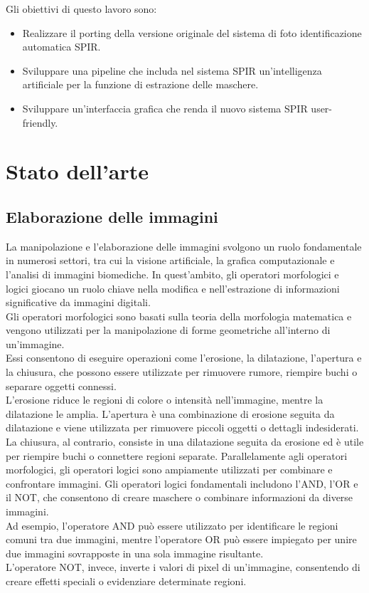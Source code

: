 \documentclass[a4paper,12pt]{report}
\begin{document}
  Gli obiettivi di questo lavoro sono: 
  \begin{itemize}
    \item Realizzare il porting della versione originale del sistema di foto identificazione automatica SPIR.
    \item Sviluppare una pipeline che includa nel sistema SPIR un'intelligenza artificiale per la funzione di estrazione delle maschere.
    \item Sviluppare un'interfaccia grafica che renda il nuovo sistema SPIR user-friendly.

  \end{itemize}



  \section{Stato dell'arte}
    \subsection{Elaborazione delle immagini}
      La manipolazione e l'elaborazione delle immagini svolgono un ruolo fondamentale in numerosi settori, tra cui la visione artificiale, la grafica computazionale e l'analisi di immagini biomediche. 
      In quest'ambito, gli operatori morfologici e logici giocano un ruolo chiave nella modifica e nell'estrazione di informazioni significative da immagini digitali. \\
      Gli operatori morfologici sono basati sulla teoria della morfologia matematica e vengono utilizzati per la manipolazione di forme geometriche all'interno di un'immagine. \\
      Essi consentono di eseguire operazioni come l'erosione, la dilatazione, l'apertura e la chiusura, che possono essere utilizzate per rimuovere rumore, riempire buchi o separare oggetti connessi. \\
      L'erosione riduce le regioni di colore o intensità nell'immagine, mentre la dilatazione le amplia. L'apertura è una combinazione di erosione seguita da dilatazione e viene utilizzata per rimuovere piccoli oggetti o dettagli indesiderati. La chiusura, al contrario, consiste in una dilatazione seguita da erosione ed è utile per riempire buchi o connettere regioni separate.
      Parallelamente agli operatori morfologici, gli operatori logici sono ampiamente utilizzati per combinare e confrontare immagini. Gli operatori logici fondamentali includono l'AND, l'OR e il NOT, che consentono di creare maschere o combinare informazioni da diverse immagini. \\
      Ad esempio, l'operatore AND può essere utilizzato per identificare le regioni comuni tra due immagini, mentre l'operatore OR può essere impiegato per unire due immagini sovrapposte in una sola immagine risultante. \\
      L'operatore NOT, invece, inverte i valori di pixel di un'immagine, consentendo di creare effetti speciali o evidenziare determinate regioni.
\end{document}
